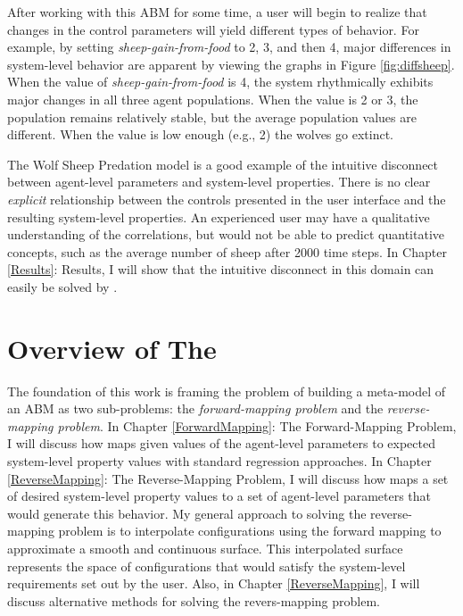 After working with this ABM for some time, a user will begin to realize that changes in the control parameters will yield different types of behavior.
For example, by setting \textit{sheep-gain-from-food} to 2, 3, and then 4, major differences in system-level behavior are apparent by viewing the graphs in Figure \ref{fig:diffsheep}.
When the value of \textit{sheep-gain-from-food} is 4, the system rhythmically exhibits major changes in all three agent populations.
When the value is 2 or 3, the population remains relatively stable, but the average population values are different.
When the value is low enough (e.g., 2) the wolves go extinct.

The Wolf Sheep Predation model is a good example of the intuitive disconnect between agent-level parameters and system-level properties.
There is no clear \textit{explicit} relationship between the controls presented in the user interface and the resulting system-level properties.
An experienced user may have a qualitative understanding of the correlations, but would not be able to predict quantitative concepts, such as the average number of sheep after 2000 time steps.
In  Chapter \ref{Results}: Results, I will show that the intuitive disconnect in this domain can easily be solved by \fw.


\section{Overview of The \framework}


The foundation of this work is framing the problem of building a meta-model of an ABM as two sub-problems: the \textit{forward-mapping problem} and the \textit{reverse-mapping problem}.
In Chapter \ref{ForwardMapping}: The Forward-Mapping Problem, I will discuss how \fw maps given values of the agent-level parameters to expected system-level property values with standard regression approaches.
In Chapter \ref{ReverseMapping}: The Reverse-Mapping Problem, I will discuss how \fw maps a set of desired system-level property values to a set of agent-level parameters that would generate this behavior.
My general approach to solving the reverse-mapping problem is to interpolate configurations using the forward mapping to approximate a smooth and continuous surface.
This interpolated surface represents the space of configurations that would satisfy the system-level requirements set out by the user.
Also, in Chapter \ref{ReverseMapping}, I will discuss alternative methods for solving the revers-mapping problem.


